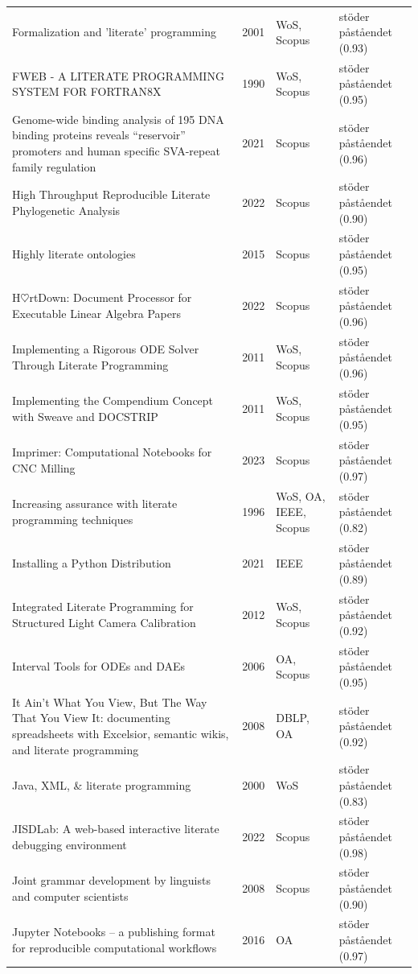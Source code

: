 \begin{longtable}{@{}%
  >{\raggedright\arraybackslash}p{}c%
  >{\raggedright\arraybackslash}p{}%
  >{\raggedright\arraybackslash}p{}@{}}
Formalization and 'literate' programming & 2001 & WoS, Scopus & stöder påståendet (0.93) \\
FWEB - A LITERATE PROGRAMMING SYSTEM FOR FORTRAN8X & 1990 & WoS, Scopus & stöder påståendet (0.95) \\
Genome-wide binding analysis of 195 DNA binding proteins reveals ``reservoir'' promoters and human specific SVA-repeat family regulation & 2021 & Scopus & stöder påståendet (0.96) \\
High Throughput Reproducible Literate Phylogenetic Analysis & 2022 & Scopus & stöder påståendet (0.90) \\
Highly literate ontologies & 2015 & Scopus & stöder påståendet (0.95) \\
H$\heartsuit$rtDown: Document Processor for Executable Linear Algebra Papers & 2022 & Scopus & stöder påståendet (0.96) \\
Implementing a Rigorous ODE Solver Through Literate Programming & 2011 & WoS, Scopus & stöder påståendet (0.96) \\
Implementing the Compendium Concept with Sweave and DOCSTRIP & 2011 & WoS, Scopus & stöder påståendet (0.95) \\
Imprimer: Computational Notebooks for CNC Milling & 2023 & Scopus & stöder påståendet (0.97) \\
Increasing assurance with literate programming techniques & 1996 & WoS, OA, IEEE, Scopus & stöder påståendet (0.82) \\
Installing a Python Distribution & 2021 & IEEE & stöder påståendet (0.89) \\
Integrated Literate Programming for Structured Light Camera Calibration & 2012 & WoS, Scopus & stöder påståendet (0.92) \\
Interval Tools for ODEs and DAEs & 2006 & OA, Scopus & stöder påståendet (0.95) \\
It Ain't What You View, But The Way That You View It: documenting spreadsheets with Excelsior, semantic wikis, and literate programming & 2008 & DBLP, OA & stöder påståendet (0.92) \\
Java, XML, \& literate programming & 2000 & WoS & stöder påståendet (0.83) \\
JISDLab: A web-based interactive literate debugging environment & 2022 & Scopus & stöder påståendet (0.98) \\
Joint grammar development by linguists and computer scientists & 2008 & Scopus & stöder påståendet (0.90) \\
Jupyter Notebooks -- a publishing format for reproducible computational workflows & 2016 & OA & stöder påståendet (0.97) \\

\end{longtable}
